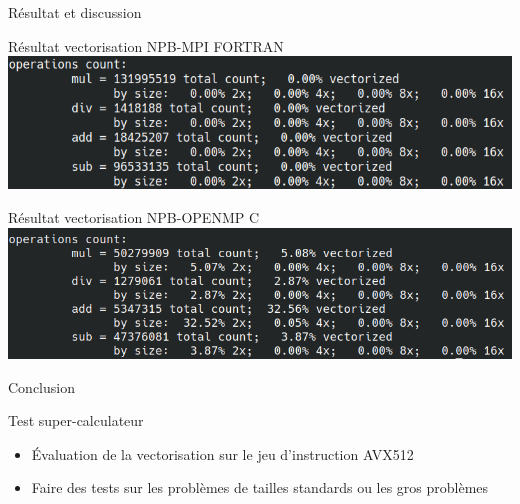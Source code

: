 \documentclass{beamer}
\begin{document}
\begin{frame}{Résultat et discussion}

  \begin{block}{Résultat vectorisation NPB-MPI FORTRAN}
    \includegraphics[width=0.6\linewidth]{../ressources/vect1.png}
  \end{block}
  
  \begin{block}{Résultat vectorisation NPB-OPENMP C}
    \includegraphics[width=0.6\linewidth]{../ressources/vcopenmp.png}
  \end{block}

\end{frame}

\begin{frame}{ Conclusion}

  \begin{block}{Test super-calculateur}
    \begin{itemize}
    \item Évaluation de la vectorisation sur le jeu d'instruction AVX512
    \item Faire des tests sur les problèmes de tailles standards ou les gros problèmes
    \end{itemize}
  \end{block}
  
\end{frame}
\end{document}

